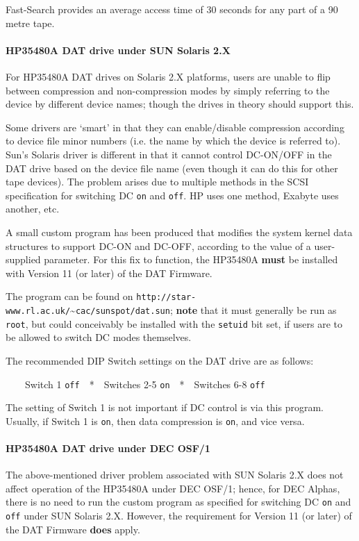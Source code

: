 \documentclass[11pt]{article}
\begin{document}
Fast-Search provides an average access time of 30 seconds for any part of a
90 metre tape.

\paragraph {HP35480A DAT drive under SUN Solaris 2.X}

For HP35480A DAT drives on Solaris 2.X platforms, users are unable to flip
between compression and non-compression modes by simply referring to the
device by different device names; though the drives in theory should support
this.

Some drivers are `smart' in that they can enable/disable compression
according to device file minor numbers (i.e. the name by which the device
is referred to). Sun's Solaris driver is different in that it cannot control
DC-ON/OFF in the DAT drive based on the device file name (even though it can
do this for other tape devices). The problem arises due to multiple methods
in the SCSI specification for switching DC {\tt on} and {\tt off}. HP uses
one method, Exabyte uses another, etc.

A small custom program has been produced that modifies the system kernel
data structures to support DC-ON and DC-OFF, according to the value of a
user-supplied parameter. For this fix to function, the HP35480A {\bf must}
be installed with Version 11 (or later) of the DAT Firmware.

The program can be found on
{\tt http://star-www.rl.ac.uk/}\~{ }{\tt cac/sunspot/dat.sun}; {\bf note}
that it must generally be run as {\tt root}, but could conceivably be installed
with the {\tt setuid} bit set, if users are to be allowed to switch DC modes
themselves.

The recommended DIP Switch settings on the DAT drive are as follows:

\ \ \ \ Switch 1 {\tt off}\ \ *\ \ Switches 2-5 {\tt on}\ \ *\ \ Switches
6-8 {\tt off}

The setting of Switch 1 is not important if DC control is via this program.
Usually, if Switch 1 is {\tt on}, then data compression is {\tt on}, and vice
versa.

\paragraph {HP35480A DAT drive under DEC OSF/1}

The above-mentioned driver problem associated with SUN Solaris 2.X does not
affect operation of the HP35480A under DEC OSF/1; hence, for DEC Alphas,
there is no need to run the custom program as specified for switching DC
{\tt on} and {\tt off} under SUN Solaris 2.X. However, the requirement for
Version 11 (or later) of the DAT Firmware {\bf does} apply.
\end{document}
